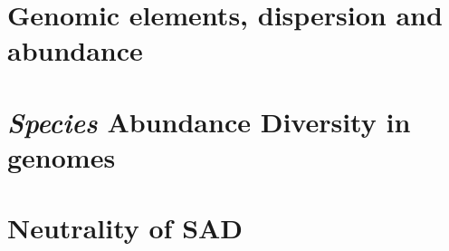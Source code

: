 
\section{Genomic elements, dispersion and abundance}

\section{\textit{Species} Abundance Diversity in genomes}

\section{Neutrality of SAD}

